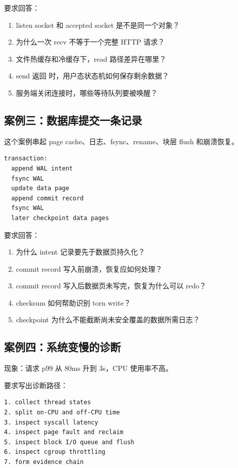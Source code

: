 要求回答：

\begin{enumerate}
\tightlist
\item listen socket 和 accepted socket 是不是同一个对象？
\item 为什么一次 recv 不等于一个完整 HTTP 请求？
\item 文件热缓存和冷缓存下，read 路径差异在哪里？
\item send 返回  时，用户态状态机如何保存剩余数据？
\item 服务端关闭连接时，哪些等待队列要被唤醒？
\end{enumerate}

\subsection{案例三：数据库提交一条记录}

这个案例串起 page cache、日志、fsync、rename、块层 flush 和崩溃恢复。

\begin{lstlisting}
transaction:
  append WAL intent
  fsync WAL
  update data page
  append commit record
  fsync WAL
  later checkpoint data pages
\end{lstlisting}

要求回答：

\begin{enumerate}
\tightlist
\item 为什么 intent 记录要先于数据页持久化？
\item commit record 写入前崩溃，恢复应如何处理？
\item commit record 写入后数据页未写完，恢复为什么可以 redo？
\item checksum 如何帮助识别 torn write？
\item checkpoint 为什么不能截断尚未安全覆盖的数据所需日志？
\end{enumerate}

\subsection{案例四：系统变慢的诊断}

现象：请求 p99 从 80ms 升到 3s，CPU 使用率不高。

要求写出诊断路径：

\begin{lstlisting}
1. collect thread states
2. split on-CPU and off-CPU time
3. inspect syscall latency
4. inspect page fault and reclaim
5. inspect block I/O queue and flush
6. inspect cgroup throttling
7. form evidence chain
\end{lstlisting}

